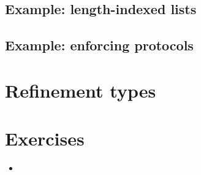\documentclass{beamer}
\begin{document}
\subsection{Example: length-indexed lists}
\subsection{Example: enforcing protocols}

\section{Refinement types}
\section{Exercises}

\begin{frame}{}
\begin{itemize}
	\item 
\end{itemize}
\end{frame}
\end{document}
